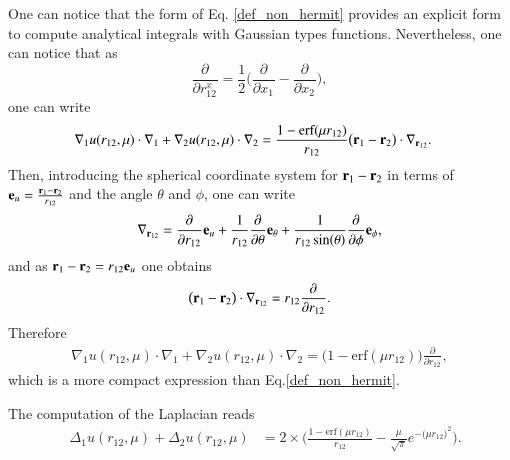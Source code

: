 \documentclass[aip,jcp,reprint,noshowkeys,superscriptaddress]{revtex4-1}
\newcommand{\deriv}[3]{\frac{\partial^{#3} #1}{\partial {#2}^{#3}}}
\newcommand{\br}[0]{{\bf {r}}}
\begin{document}
One can notice that the form of Eq. \eqref{def_non_hermit} provides an explicit form to compute analytical integrals with Gaussian types functions. 
Nevertheless, one can notice that as 
\begin{equation}
 \deriv{}{r_{12}^x}{} = \frac{1}{2} \bigg( \deriv{}{x_1}{} - \deriv{}{x_2}{} \bigg),
\end{equation}
one can write 
\begin{equation}
 \begin{aligned}
 \label{eq:nabla_i_nabla0}
& \nabla_1 u(r_{12},\mu) \cdot \nabla_1 + \nabla_2 u(r_{12},\mu) \cdot \nabla_2 = \frac{1 - \text{erf}(\mu r_{12})}{r_{12}} \big( \br{}_1 - \br{}_2 \big) \cdot \nabla_{\br{}_{12}}.
 \end{aligned}
\end{equation}
Then, introducing the spherical coordinate system for $\br{}_1 - \br{}_2$ in terms of ${\bf e}_u= \frac{\br{}_1 - \br{}_2}{r_{12}}$ and the angle $\theta$ and $\phi$, one can write 
\begin{equation}
 \nabla_{\br{}_{12}} = \deriv{}{r_{12}}{} {\bf e}_u + \frac{1}{r_{12}} \deriv{}{\theta}{} {\bf e}_{\theta} + \frac{1}{r_{12} \sin(\theta)} \deriv{}{\phi}{} {\bf e}_\phi,
\end{equation}
and as $\br{}_1 - \br{}_2 = r_{12} {\bf e}_u$ one obtains
\begin{equation}
 \big( \br{}_1 - \br{}_2 \big) \cdot \nabla_{\br{}_{12}} = r_{12} \deriv{}{r_{12}}{}.
\end{equation}
Therefore 
\begin{equation}
 \begin{aligned}
 \label{eq:nabla_i_nabla1}
 \nabla_1 u(r_{12},\mu) \cdot \nabla_1 + \nabla_2 u(r_{12},\mu) \cdot \nabla_2 = \bigg( 1 - \text{erf}(\mu r_{12})\bigg) \deriv{}{r_{12}}{},
 \end{aligned}
\end{equation}
which is a more compact expression than Eq.\eqref{def_non_hermit}. 

The computation of the Laplacian reads 
\begin{equation}
 \begin{aligned}
 \label{eq:d2_x1_2}
 &\Delta_1 u(r_{12},\mu) + \Delta_2 u(r_{12},\mu)
 & = 2 \times \bigg( \frac{1 - \text{erf}(\mu r_{12})}{r_{12}} - \frac{\mu}{\sqrt{\pi}} e^{-\big(\mu r_{12} \big)^2}  \bigg).
 \end{aligned}
\end{equation}
\end{document}
